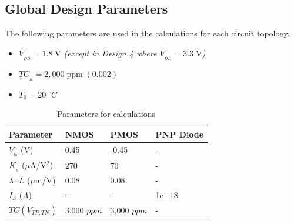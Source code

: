 \documentclass[conference]{IEEEtran}
\begin{document}
\subsection{Global Design Parameters}
The following parameters are used in the calculations for each circuit topology.
\begin{itemize}
  \item $V_{_{DD}} = 1.8\;\mathrm{V}$ \emph{(except in Design 4 where $V_{_{DD}} = 3.3\;\mathrm{V}$)}
  \item $TC_{_R} = 2,000\;\mathrm{ppm}\;(0.002)$
	\item $T_0 = 20\;^{\circ} C$
\end{itemize}
\begin{table}[!htbp]
  \caption[]{Parameters for calculations}
  \label{tab:parameters}
  \centering
  \begin{tabular}{|l|l|l|l|}
    \hline
    Parameter                       & NMOS    & PMOS	&PNP Diode     \\ \hline
    $V_{_{to}}$ (V)                   & 0.45    & -0.45	&-      \\ 
    $K_{_n}$ ($\mu$A/V$^2$)               & 270     & 70 	&-        \\ 
    ${\lambda}{\cdot}L$ ($\mu$m/V)  & 0.08    & 0.08	&-       \\
    $I_S$ ($A$)				&-	&-	&1e$-18$\\
    $TC(V_{TP,TN})$		&3,000 $ppm$ &3,000 $ppm$	&-	\\
    \hline
  \end{tabular}
\end{table}

\end{document}
